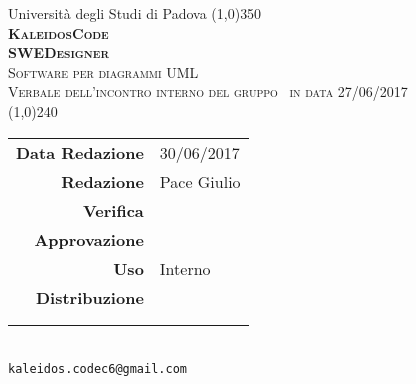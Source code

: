 \documentclass[a4paper,12pt]{article}
\author{KaleidosCode}
\date{29/05/2017}
\begin{document}
	\begin{titlepage}
		\centering Università degli Studi di Padova
		\line(1,0){350}\\
		\vspace{0.4cm}
		{\bfseries\scshape\LARGE KaleidosCode\\}
		\vspace{0.4cm}
		{\bfseries\scshape\LARGE SWEDesigner\\}
		{\scshape\Large Software per diagrammi UML\\}
		\vspace{1cm}
		{\scshape\Large Verbale dell'incontro interno del gruppo \kaleidoscode\ in data 27/06/2017 \\}		%
		\vspace{1.4cm}
		\logo
		\vspace{1.2cm}
		\line(1,0){240}\\
		\begin{tabular}{r|l}
			{\hfill \textbf{Data Redazione}} 	& 30/06/2017\\	%
			{\hfill \textbf{Redazione}} 		& Pace Giulio\\
			{\hfill \textbf{Verifica}} 			& \\
			{\hfill \textbf{Approvazione}} 		& \\
			{\hfill \textbf{Uso}} 				& Interno\\
			{\hfill \textbf{Distribuzione}} 	& \vardanega \\ & \cardin \\ & \kaleidoscode\\
		\end{tabular}\\
		\vspace{2cm}
		\texttt{kaleidos.codec6@gmail.com}
	\end{titlepage}

	\pagestyle{mymain}
	\newpage
		
		
	\label{LastPage}
\end{document}
